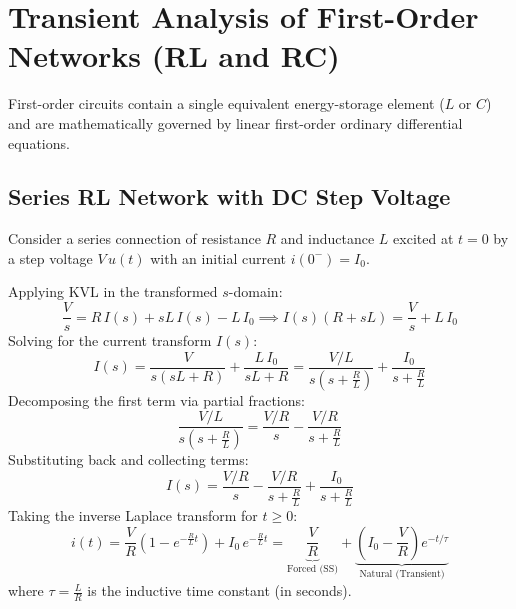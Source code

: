 \documentclass[12pt,a4paper]{article}
\begin{document}
\section{Transient Analysis of First-Order Networks (RL and RC)}

First-order circuits contain a single equivalent energy-storage element ($L$ or $C$) and are mathematically governed by linear first-order ordinary differential equations.

\subsection{Series RL Network with DC Step Voltage}

Consider a series connection of resistance $R$ and inductance $L$ excited at $t=0$ by a step voltage $V\,u(t)$ with an initial current $i(0^-) = I_0$.

\begin{tcolorbox}[formulabox, title={\textbf{Mathematical Derivation of RL Response}}]
Applying KVL in the transformed $s$-domain:
\begin{equation}
  \frac{V}{s} = R\,I(s) + sL\,I(s) - L\,I_0 \implies I(s)(R + sL) = \frac{V}{s} + L\,I_0
\end{equation}
Solving for the current transform $I(s)$:
\begin{equation}
  I(s) = \frac{V}{s(sL + R)} + \frac{L\,I_0}{sL + R} = \frac{V/L}{s\left(s + \frac{R}{L}\right)} + \frac{I_0}{s + \frac{R}{L}}
\end{equation}
Decomposing the first term via partial fractions:
\begin{equation}
  \frac{V/L}{s\left(s + \frac{R}{L}\right)} = \frac{V/R}{s} - \frac{V/R}{s + \frac{R}{L}}
\end{equation}
Substituting back and collecting terms:
\begin{equation}
  I(s) = \frac{V/R}{s} - \frac{V/R}{s + \frac{R}{L}} + \frac{I_0}{s + \frac{R}{L}}
\end{equation}
Taking the inverse Laplace transform for $t \ge 0$:
\begin{equation}
  i(t) = \frac{V}{R}\left(1 - e^{-\frac{R}{L}t}\right) + I_0\,e^{-\frac{R}{L}t} = \underbrace{\frac{V}{R}}_{\text{Forced (SS)}} + \underbrace{\left(I_0 - \frac{V}{R}\right)e^{-t/\tau}}_{\text{Natural (Transient)}}
\end{equation}
where $\tau = \frac{L}{R}$ is the inductive time constant (in seconds).
\end{tcolorbox}
\end{document}
